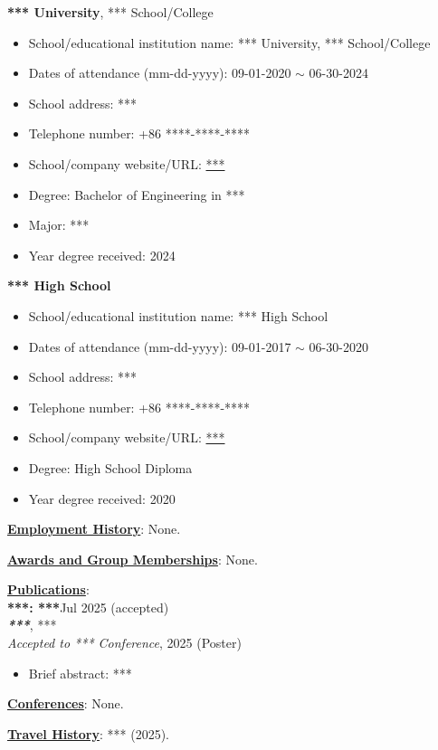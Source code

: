 \documentclass[a4paper,11pt]{article}
\begin{document}
\noindent\textbf{*** University}, *** School/College %
\begin{itemize}[leftmargin=1.5em]
    \item School/educational institution name: *** University, *** School/College
    \item Dates of attendance (mm-dd-yyyy): 09-01-2020 $\sim$ 06-30-2024
    \item School address: ***
    \item Telephone number: +86 ****-****-****
    \item School/company website/URL: \href{***}{***}
    \item Degree: Bachelor of Engineering in *** %
    \item Major: *** %
    \item Year degree received: 2024
\end{itemize}

\noindent\textbf{*** High School} %
\begin{itemize}[leftmargin=1.5em]
    \item School/educational institution name: *** High School
    \item Dates of attendance (mm-dd-yyyy): 09-01-2017 $\sim$ 06-30-2020
    \item School address: ***
    \item Telephone number: +86 ****-****-****
    \item School/company website/URL: \href{***}{***}
    \item Degree: High School Diploma
    \item Year degree received: 2020
\end{itemize}

\noindent\underline{\textbf{Employment History}}: None. %

\noindent\underline{\textbf{Awards and Group Memberships}}: None. %

\noindent\underline{\textbf{Publications}}:\\[0.2\baselineskip]
\textbf{***: ***}\hfill Jul 2025 (accepted) %
\\
\textbf{\textit{***}}, *** %
\\
\textit{Accepted to *** Conference}, 2025 (Poster) %
\\[-0.2\baselineskip]
\begin{itemize}
    \item Brief abstract: *** %
\end{itemize}
\vspace{0.2\baselineskip}

\noindent\underline{\textbf{Conferences}}: None. %

\noindent\underline{\textbf{Travel History}}: *** (2025). %
\end{document}
